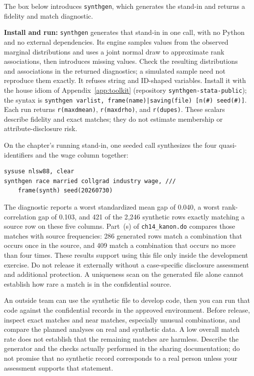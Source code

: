 The box below introduces \texttt{synthgen}, which generates the stand-in and returns a fidelity and match diagnostic.

\begin{kaobox}[frametitle=Package Integration: \texttt{synthgen}]
\textbf{Install and run:} \texttt{synthgen} generates that stand-in in one call, with no Python and no external dependencies. Its engine samples values from the observed marginal distributions and uses a joint normal draw to approximate rank associations, then introduces missing values. Check the resulting distributions and associations in the returned diagnostics; a simulated sample need not reproduce them exactly. It refuses string and ID-shaped variables. Install it with the house idiom of Appendix~\ref{app:toolkit} (repository \texttt{synthgen-stata-public}); the syntax is \texttt{synthgen varlist, frame(name)|saving(file) [n(\#) seed(\#)]}. Each run returns \texttt{r(maxdmean)}, \texttt{r(maxdrho)}, and \texttt{r(dupes)}. These scalars describe fidelity and exact matches; they do not estimate membership or attribute-disclosure risk.
\end{kaobox}

On the chapter's running stand-in, one seeded call synthesizes the four quasi-identifiers and the wage column together:
\par
{\footnotesize
\begin{verbatim}
sysuse nlsw88, clear
synthgen race married collgrad industry wage, ///
    frame(synth) seed(20260730)
\end{verbatim}
}
The diagnostic reports a worst standardized mean gap of 0.040, a worst rank-correlation gap of 0.103, and 421 of the 2{,}246 synthetic rows exactly matching a source row on these five columns. Part~(s) of \texttt{ch14\_kanon.do} compares those matches with source frequencies: 286 generated rows match a combination that occurs once in the source, and 409 match a combination that occurs no more than four times. These results support using this file only inside the development exercise. Do not release it externally without a case-specific disclosure assessment and additional protection. A uniqueness scan on the generated file alone cannot establish how rare a match is in the confidential source.

An outside team can use the synthetic file to develop code, then you can run that code against the confidential records in the approved environment. Before release, inspect exact matches and near matches, especially unusual combinations, and compare the planned analyses on real and synthetic data. A low overall match rate does not establish that the remaining matches are harmless. Describe the generator and the checks actually performed in the sharing documentation; do not promise that no synthetic record corresponds to a real person unless your assessment supports that statement.

